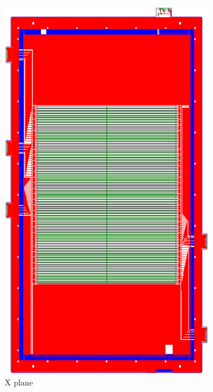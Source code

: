 \begin{figure}[h]
    \centering
    \begin{subfigure}[b]{0.4\textwidth}
        \centering
        \includegraphics[width=\textwidth]{chap3/shms_dc_x_plane.png}
        \caption{X plane}
        \label{fig:dc_x_plane}
    \end{subfigure}
    \hfill
    \begin{subfigure}[b]{0.4\textwidth}
        \centering

\end{subfigure}
\end{figure}
